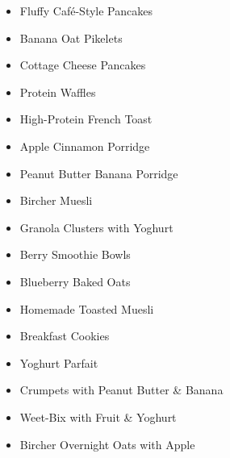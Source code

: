 \begin{itemize}
  \item \todo Fluffy Caf\'e-Style Pancakes
  \item \todo Banana Oat Pikelets
  \item \todo Cottage Cheese Pancakes
  \item \todo Protein Waffles
  \item \todo High-Protein French Toast
  \item \todo Apple Cinnamon Porridge
  \item \todo Peanut Butter Banana Porridge
  \item \todo Bircher Muesli
  \item \todo Granola Clusters with Yoghurt
  \item \todo Berry Smoothie Bowls
  \item \todo Blueberry Baked Oats
  \item \todo Homemade Toasted Muesli
  \item \todo Breakfast Cookies
  \item \todo Yoghurt Parfait
  \item \todo Crumpets with Peanut Butter \& Banana
  \item \todo Weet-Bix with Fruit \& Yoghurt
  \item \todo Bircher Overnight Oats with Apple
\end{itemize}
